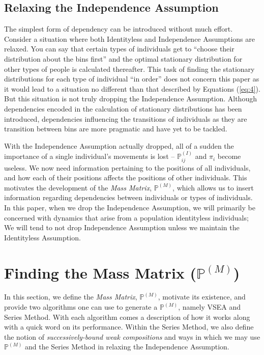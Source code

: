 \documentclass{article}
\begin{document}
\subsection{Relaxing the Independence Assumption}
The simplest form of dependency can be introduced without much effort. Consider a situation where both Identityless and Independence Assumptions are relaxed. You can say that certain types of individuals get to ``choose their distribution about the bins first'' and the optimal stationary distribution for other types of people is calculated thereafter. This task of finding the stationary distributions for each type of individual ``in order'' does not concern this paper as it would lead to a situation no different than that described by Equations (\ref{eq:4}). But this situation is not truly dropping the Independence Assumption. Although dependencies encoded in the calculation of stationary distributions has been introduced, dependencies influencing the transitions of individuals as they are transition between bins are more pragmatic and have yet to be tackled.

With the Independence Assumption actually dropped, all of a sudden the importance of a single individual's movements is lost -- $\mathbb{P}^{(I)}_{ij}$ and $\pi_i$ become useless. We now need information pertaining to the positions of all individuals, and how each of their positions affects the positions of other individuals. This motivates the development of the \textit{Mass Matrix}, $\mathbb{P}^{(M)}$, which allows us to insert information regarding dependencies between individuals or types of individuals. In this paper, when we drop the Independence Assumption, we will primarily be concerned with dynamics that arise from a population identityless individuals; We will tend to not drop Independence Assumption unless we maintain the Identityless Assumption.

\section{Finding the Mass Matrix ($\mathbb{P}^{(M)}$)}
In this section, we define the \textit{Mass Matrix}, $\mathbb{P}^{(M)}$, motivate its existence, and provide two algorithms one can use to generate a $\mathbb{P}^{(M)}$, namely VSEA and Series Method. With each algorithm comes a description of how it works along with a quick word on its performance. Within the Series Method, we also define the notion of \textit{successively-bound weak compositions} and ways in which we may use $\mathbb{P}^{(M)}$ and the Series Method in relaxing the Independence Assumption.
\end{document}
